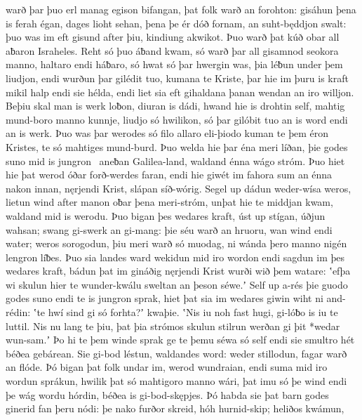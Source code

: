 warð þar þuo erl manag \hld\ egison bifangan,
þat folk warð an forohton: \hld\ gisáhun þena is ferah égan,
dages lioht sehan, \hld\ þena þe ér dóð fornam,
an suht-będdjon swalt: \hld\ þuo was im eft gisund after þiu,
kindiung akwikot. \hld\ Þuo warð þat kúð obar all
aƀaron Israheles. \hld\ Reht só þuo áƀand kwam,
só warð þar all gisamnod \hld\ seokora manno,
haltaro endi háƀaro, \hld\ só hwat só þar hwergin was,
þia léƀun under þem liudjon, \hld\ endi wurðun þar gilédit tuo,
kumana te Kriste, \hld\ þar hie im þuru is kraft mikil
halp endi sie hélda, \hld\ endi liet sia eft gihaldana þanan
wendan an iro willjon. \hld\ Beþiu skal man is werk loƀon,
diuran is dádi, \hld\ hwand hie is drohtin self,
mahtig mund-boro \hld\ manno kunnje,
liudjo só hwilikon, \hld\ só þar gilóbit tuo
an is word endi an is werk. \hld\ Þuo was þar werodes só filo
allaro eli-þiodo \hld\ kuman te þem éron Kristes,
te só mahtiges mund-burd. \hld\ Þuo welda hie þar éna meri líðan,
þie godes suno mid is jungron \hld\ aneƀan Galilea-land,
waldand énna wágo stróm. \hld\ Þuo hiet hie þat werod óðar
forð-werdes faran, \hld\ endi hie giwét im fahora sum
an énna nakon innan, \hld\ nęrjendi Krist,
slápan síð-wórig. \hld\ Segel up dádun
weder-wísa weros, \hld\ lietun wind after
manon oƀar þena meri-stróm, \hld\ unþat hie te middjan kwam,
waldand mid is werodu. \hld\ Þuo bigan þes wedares kraft,
úst up stígan, \hld\ úðjun wahsan;
swang gi-swerk an gi-mang: \hld\ þie séu warð an hruoru,
wan wind endi water; \hld\ weros sorogodun,
þiu meri warð só muodag, \hld\ ni wánda þero manno nigén
lengron líƀes. \hld\ Þuo sia landes ward
wekidun mid iro wordon \hld\ endi sagdun im þes wedares kraft,
bádun þat im gináðig \hld\ nęrjendi Krist
wurði wið þem watare: \hld\ ʽefþa wi skulun hier te wunder-kwálu
sweltan an þeson séwe.ʼ \hld\ Self up a-rés
þie guodo godes suno \hld\ endi te is jungron sprak,
hiet þat sia im wedares giwin \hld\ wiht ni and-rédin:
ʽte hwí sind gi só forhta?ʼ \hld\ kwaþie. ʽNis iu noh fast hugi,
gi-lóƀo is iu te luttil. \hld\ Nis nu lang te þiu,
þat þia strómos skulun \hld\ stilrun werðan
gi þit *wedar wun-sam.ʼ \hld\ Þo hi te þem winde sprak
ge te þemu séwa só self \hld\ endi sie smultro hét
béðea gebárean. \hld\ Sie gi-bod léstun,
waldandes word: \hld\ weder stillodun,
fagar warð an flóde. \hld\ Þó bigan þat folk undar im,
werod wundraian, \hld\ endi suma mid iro wordun sprákun,
hwilik þat só mahtigoro \hld\ manno wári,
þat imu só þe wind endi þe wág \hld\ wordu hórdin,
béðea is gi-bod-skępjes. \hld\ Þó habda sie þat barn godes
ginerid fan þeru nódi: \hld\ þe nako furðor skreid,
hóh hurnid-skip; \hld\ heliðos kwámun,
